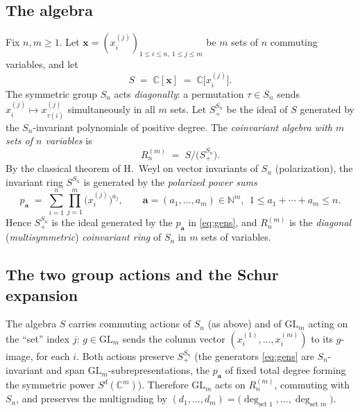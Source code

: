 \documentclass[11pt]{article}
\theoremstyle{definition}
\theoremstyle{remark}
\newcommand{\GL}{\mathrm{GL}}
\newcommand{\CC}{\mathbb{C}}
\newcommand{\NN}{\mathbb{N}}
\newcommand{\bs}{\boldsymbol}
\begin{document}
\subsection{The algebra}
Fix $n,m\ge 1$.  Let $\bs x=(x_{i}^{(j)})_{1\le i\le n,\ 1\le j\le m}$ be $m$ sets of $n$
commuting variables, and let
\[
S \;=\; \CC[\bs x]\;=\;\CC\bigl[x_i^{(j)}\bigr].
\]
The symmetric group $S_n$ acts \emph{diagonally}: a permutation $\tau\in S_n$ sends
$x_i^{(j)}\mapsto x_{\tau(i)}^{(j)}$ simultaneously in all $m$ sets.  Let
$S^{S_n}_+$ be the ideal of $S$ generated by the $S_n$-invariant polynomials of positive
degree.  The \emph{coinvariant algebra with $m$ sets of $n$ variables} is
\begin{equation}\label{eq:def-R}
R_n^{(m)}\;=\;S\big/\bigl(S^{S_n}_+\bigr).
\end{equation}
By the classical theorem of H.~Weyl on vector invariants of $S_n$ (polarization), the
invariant ring $S^{S_n}$ is generated by the \emph{polarized power sums}
\begin{equation}\label{eq:gens}
p_{\bs a}\;=\;\sum_{i=1}^{n}\prod_{j=1}^{m}\bigl(x_i^{(j)}\bigr)^{a_j},
\qquad \bs a=(a_1,\dots,a_m)\in\NN^m,\ \ 1\le a_1+\cdots+a_m\le n .
\end{equation}
Hence $S^{S_n}_+$ is the ideal generated by the $p_{\bs a}$ in \eqref{eq:gens}, and
$R_n^{(m)}$ is the \emph{diagonal} (\emph{multisymmetric}) \emph{coinvariant ring} of
$S_n$ in $m$ sets of variables.

\subsection{The two group actions and the Schur expansion}
The algebra $S$ carries commuting actions of $S_n$ (as above) and of $\GL_m$ acting on the
``set'' index $j$: $g\in\GL_m$ sends the column vector $(x_i^{(1)},\dots,x_i^{(m)})$ to its
$g$-image, for each $i$.  Both actions preserve $S^{S_n}_+$ (the generators \eqref{eq:gens}
are $S_n$-invariant and span $\GL_m$-subrepresentations, the $p_{\bs a}$ of fixed total
degree forming the symmetric power $S^{d}(\CC^m)$).  Therefore $\GL_m$ acts on $R_n^{(m)}$,
commuting with $S_n$, and preserves the multigrading by
$(d_1,\dots,d_m)=\bigl(\deg_{\text{set }1},\dots,\deg_{\text{set }m}\bigr)$.
\end{document}
